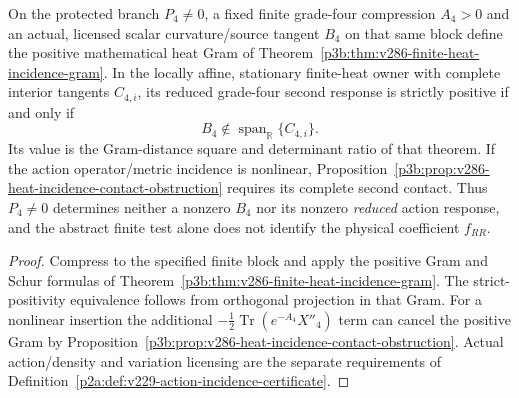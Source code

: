 \documentclass[12pt,a4paper]{article}
\begin{document}
\begin{corollary}
\label{p3d:cor:v286-protected-grade-four-incidence-test}
On the protected branch $P_4\ne0$, a fixed finite grade-four
compression $A_4>0$ and an actual, licensed scalar curvature/source
tangent $B_4$ on that same block define the positive mathematical
heat Gram of
Theorem~\ref{p3b:thm:v286-finite-heat-incidence-gram}. In the
locally affine, stationary finite-heat owner with complete interior
tangents $C_{4,i}$, its reduced grade-four second response is strictly
positive if and only if
\[
 B_4\notin\operatorname{span}_{\mathbb R}\{C_{4,i}\}.
\]
Its value is the Gram-distance square and determinant ratio of that
theorem.  If the action operator/metric incidence is nonlinear,
Proposition~\ref{p3b:prop:v286-heat-incidence-contact-obstruction}
requires its complete second contact.  Thus $P_4\ne0$ determines
neither a nonzero $B_4$ nor its nonzero \emph{reduced} action response,
and the abstract finite test alone does not identify the physical
coefficient $f_{RR}$.
\end{corollary}
\begin{proof}
Compress to the specified finite block and apply the positive Gram
and Schur formulas of
Theorem~\ref{p3b:thm:v286-finite-heat-incidence-gram}.
The strict-positivity equivalence follows from
orthogonal projection in that Gram. For a nonlinear insertion the
additional $-\tfrac12\operatorname{Tr}(e^{-A_4}X''_{4})$ term can
cancel the positive Gram by
Proposition~\ref{p3b:prop:v286-heat-incidence-contact-obstruction}. Actual action/density and variation
licensing are the separate requirements of
Definition~\ref{p2a:def:v229-action-incidence-certificate}.
\end{proof}
\end{document}
